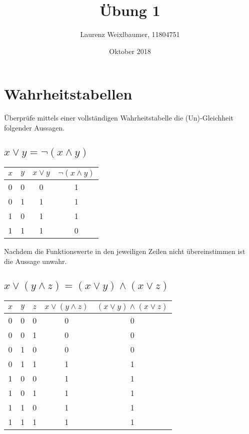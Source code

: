\documentclass{article}
\title{Übung 1}
\author{Laurenz Weixlbaumer, 11804751}
\date{Oktober 2018}
\begin{document}
\maketitle

\section{Wahrheitstabellen}
Überprüfe mittels einer vollständigen Wahrheitstabelle die (Un)-Gleichheit folgender Aussagen.

\subsection{$x \lor y = \neg{(x \land y)}$}

\begin{center}
\begin{tabular}{c | c || c | c}
    $x$ & $y$ & $x \lor y$ & $\neg(x \land y)$\\
    \hline
    0 & 0 & 0 & 1\\
    0 & 1 & 1 & 1\\
    1 & 0 & 1 & 1\\
    1 & 1 & 1 & 0
\end{tabular}
\end{center}

\vspace{10px}

Nachdem die Funktionswerte in den jeweiligen Zeilen nicht übereinstimmen ist die Aussage unwahr.

\vspace{10px}

\subsection{$x \lor (y \land z) = (x \lor y) \land (x \lor z)$}

\begin{center}
\begin{tabular}{c | c | c || c | c}
    $x$ & $y$ & $z$ & $x \lor (y \land z)$ & $(x \lor y) \land (x \lor z)$\\
    \hline
    0 & 0 & 0 & 0 & 0\\
    0 & 0 & 1 & 0 & 0\\
    0 & 1 & 0 & 0 & 0\\
    0 & 1 & 1 & 1 & 1\\
    1 & 0 & 0 & 1 & 1\\
    1 & 0 & 1 & 1 & 1\\
    1 & 1 & 0 & 1 & 1\\
    1 & 1 & 1 & 1 & 1
\end{tabular}
\end{center}
\end{document}
